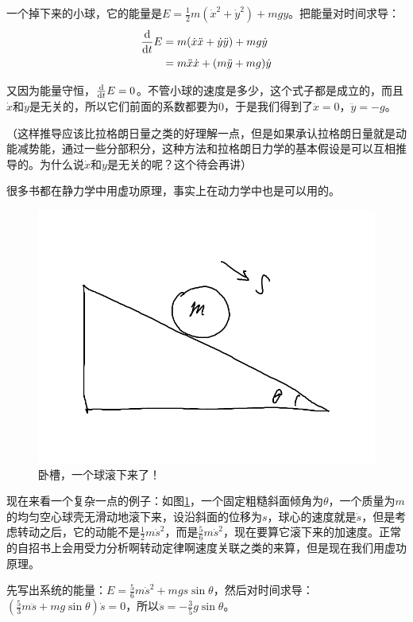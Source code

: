 一个掉下来的小球，它的能量是$E=\frac{1}{2}m(\dot x^2+\dot y^2)+m g y$。把能量对时间求导：
\begin{align*}
\frac{\mathop{}\!\mathrm{d}}{\mathop{}\!\mathrm{d} t} E&=m(\dot x \ddot x+\dot y \ddot y)+m g \dot y \\
&=m \ddot x \dot x+(m \ddot y+m g) \dot y
\end{align*}

又因为能量守恒，$\frac{\mathop{}\!\mathrm{d}}{\mathop{}\!\mathrm{d} t} E=0$。不管小球的速度是多少，这个式子都是成立的，而且$\dot x$和$\dot y$是无关的，所以它们前面的系数都要为$0$，于是我们得到了$\ddot x=0$，$\ddot y=-g$。

（这样推导应该比拉格朗日量之类的好理解一点，但是如果承认拉格朗日量就是动能减势能，通过一些分部积分，这种方法和拉格朗日力学的基本假设是可以互相推导的。为什么说$\dot x$和$\dot y$是无关的呢？这个待会再讲）

很多书都在静力学中用虚功原理，事实上在动力学中也是可以用的。
\begin{figure}[htb]
\centering
\includegraphics[scale=0.5]{fig/slope-ball}
\caption{卧槽，一个球滚下来了！}
\label{fig-slope-ball}
\end{figure}

现在来看一个复杂一点的例子：如图\ref{fig-slope-ball}，一个固定粗糙斜面倾角为$\theta$，一个质量为$m$的均匀空心球壳无滑动地滚下来，设沿斜面的位移为$s$，球心的速度就是$\dot s$，但是考虑转动之后，它的动能不是$\frac{1}{2} m \dot s^2$，而是$\frac{5}{6} m \dot s^2$，现在要算它滚下来的加速度。正常的自招书上会用受力分析啊转动定律啊速度关联之类的来算，但是现在我们用虚功原理。

先写出系统的能量：$E=\frac{5}{6} m \dot s^2+m g s \sin \theta$，然后对时间求导：$(\frac{5}{3} m \ddot s+m g \sin \theta) \dot s=0$，所以$\ddot s=-\frac{3}{5} g \sin \theta$。

